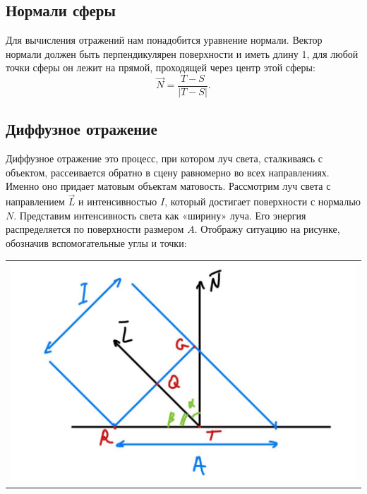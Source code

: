 \subsection{Нормали сферы}

Для вычисления отражений нам понадобится уравнение нормали. Вектор нормали должен быть перпендикулярен поверхности и иметь длину 1, для любой точки сферы он лежит на прямой, проходящей через центр этой сферы:
\begin{equation}
	\vec{N}=\frac{T-S}{|T-S|}.
\end{equation}

\subsection{Диффузное отражение}

Диффузное отражение это процесс, при котором луч света, сталкиваясь с объектом, рассеивается обратно в сцену равномерно во всех направлениях. Именно оно придает матовым объектам матовость.
Рассмотрим луч света с направлением $\vec{L}$ и интенсивностью $I$, который достигает поверхности с нормалью $N$. Представим интенсивность света как «ширину» луча. Его энергия распределяется по поверхности размером $A$. Отображу ситуацию на рисунке, обозначив вспомогательные углы и точки:

\begin{table}[H]
	\centering
	\begin{tabular}{p{1\linewidth}}
		\centering
		\includegraphics[height=0.4\linewidth]{include/2-1.png}
		\captionof{figure}{Диффузное отражение света}
		\label{img:2-1}
	\end{tabular}
\end{table}

